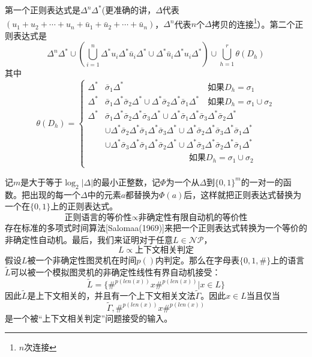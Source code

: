 \documentclass[twocolumn]{article}
\theoremstyle{nonumberplain}%
\begin{document}
    第一个正则表达式是$\Delta^n\Delta^*$(更准确的讲，$\Delta$代表$(u_1+u_2+\cdots+u_n+\bar{u}_1+\bar{u}_2+\cdots+\bar{u}_n)$，$\Delta^n$代表$n$个$\Delta$拷贝的连接\footnote{$n$次连接}）。第二个正则表达式是
    $$\Delta^n\Delta^*\cup\left(\bigcup_{i=1}^{n}\Delta^*u_i\Delta^*\bar{u}_i\Delta^* \cup \Delta^*\bar{u}_i\Delta^*u_i\Delta^*\right)\cup\bigcup_{h=1}^{r}\theta(D_h)$$
    其中
    \begin{equation}\nonumber
      \theta(D_h)=\left\{
      \begin{aligned}
        \Delta^*&\bar{\sigma}_1\Delta^*  \qquad \qquad \qquad \qquad \qquad \text{如果}D_h=\sigma_1\\
        \Delta^*&\bar{\sigma}_1\Delta^*\bar{\sigma}_2\Delta^*
            \cup \Delta^*\bar{\sigma}_2\Delta^*\bar{\sigma}_1\Delta^* \quad \text{如果}D_h=\sigma_1\cup\sigma_2\\
        \Delta^*&\bar{\sigma}_1\Delta^*\bar{\sigma}_2\Delta^*\bar{\sigma}_3\Delta^*
            \cup \Delta^*\bar{\sigma}_1\Delta^*\bar{\sigma}_3\Delta^*\bar{\sigma}_2\Delta^* \\
            &\cup\Delta^*\bar{\sigma}_2\Delta^*\bar{\sigma}_1\Delta^*\bar{\sigma}_3\Delta^*
                \cup \Delta^*\bar{\sigma}_2\Delta^*\bar{\sigma}_3\Delta^*\bar{\sigma}_1\Delta^* \\
            &\cup\Delta^*\bar{\sigma}_3\Delta^*\bar{\sigma}_1\Delta^*\bar{\sigma}_2\Delta^*
                \cup \Delta^*\bar{\sigma}_3\Delta^*\bar{\sigma}_2\Delta^*\bar{\sigma}_1\Delta^* \\
        & \qquad \qquad \qquad \qquad \qquad \text{如果}D_h=\sigma_1\cup\sigma_2\\
      \end{aligned}
      \right.
    \end{equation}

    记$m$是大于等于$\log_2{|\Delta|}$的最小正整数，记$\Phi$为一个从$\Delta$到$\{0,1\}^m$的一对一的函数。把出现的每一个$\Delta$中的元素$a$都替换为$\Phi(a)$后，这样就把正则表达式替换为一个在$\{0,1\}$上的正则表达式。
    $$\text{正则语言的等价性}\propto\text{非确定性有限自动机的等价性}$$
    存在标准的多项式时间算法[Salomaa(1969)]来把一个正则表达式转换为一个等价的非确定性自动机。最后，我们来证明对于任意$L\in\mathcal{NP}$，$$L\propto\text{上下文相关判定}$$
    假设$L$被一个非确定性图灵机在时间$p()$内判定。那么在字母表$\{0,1,\#\}$上的语言$\widetilde{L}$可以被一个模拟图灵机的非确定性线性有界自动机接受：
    $$\widetilde{L}=\{\#^{p(len(x))}x\#^{p(len(x))}|x\in L\}$$
    因此$\widetilde{L}$是上下文相关的，并且有一个上下文相关文法$\widetilde{\Gamma}$。因此$x\in L$当且仅当
    $$\widetilde{\Gamma},\#^{p(len(x))}x\#^{p(len(x))}$$
    是一个被“上下文相关判定”问题接受的输入。
\end{document}
